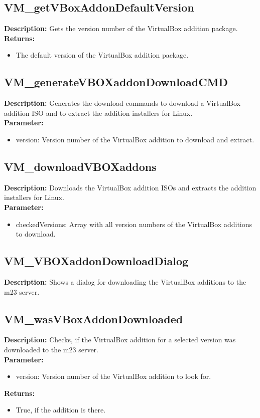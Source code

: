 \subsection{VM\_getVBoxAddonDefaultVersion}
\textbf{Description:} Gets the version number of the VirtualBox addition package.\\
\textbf{Returns:}
\begin{itemize}
\item The default version of the VirtualBox addition package.
\end{itemize}

\subsection{VM\_generateVBOXaddonDownloadCMD}
\textbf{Description:} Generates the download commands to download a VirtualBox addition ISO and to extract the addition installers for Linux.\\
\textbf{Parameter:}
\begin{itemize}
\item version: Version number of the VirtualBox addition to download and extract.
\end{itemize}

\subsection{VM\_downloadVBOXaddons}
\textbf{Description:} Downloads the VirtualBox addition ISOs and extracts the addition installers for Linux.\\
\textbf{Parameter:}
\begin{itemize}
\item checkedVersions: Array with all version numbers of the VirtualBox additions to download.
\end{itemize}

\subsection{VM\_VBOXaddonDownloadDialog}
\textbf{Description:} Shows a dialog for downloading the VirtualBox additions to the m23 server.\\

\subsection{VM\_wasVBoxAddonDownloaded}
\textbf{Description:} Checks, if the VirtualBox addition for a selected version was downloaded to the m23 server.\\
\textbf{Parameter:}
\begin{itemize}
\item version: Version number of the VirtualBox addition to look for.
\end{itemize}
\textbf{Returns:}
\begin{itemize}
\item True, if the addition is there.
\end{itemize}

